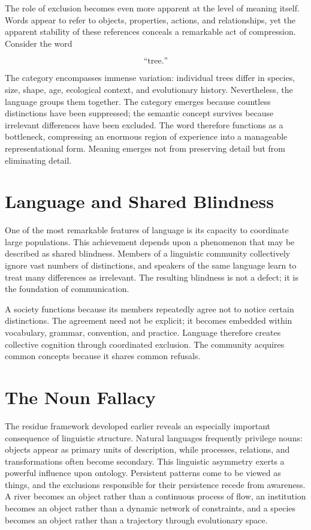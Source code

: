 \documentclass[11pt,oneside]{book}
\theoremstyle{plain}
\theoremstyle{definition}
\theoremstyle{remark}
\begin{document}
The role of exclusion becomes even more apparent at the level of meaning itself. Words appear to refer to objects, properties, actions, and relationships, yet the apparent stability of these references conceals a remarkable act of compression. Consider the word

\begin{equation}
\text{``tree.''}
\end{equation}

The category encompasses immense variation: individual trees differ in species, size, shape, age, ecological context, and evolutionary history. Nevertheless, the language groups them together. The category emerges because countless distinctions have been suppressed; the semantic concept survives because irrelevant differences have been excluded. The word therefore functions as a bottleneck, compressing an enormous region of experience into a manageable representational form. Meaning emerges not from preserving detail but from eliminating detail.

\section{Language and Shared Blindness}

One of the most remarkable features of language is its capacity to coordinate large populations. This achievement depends upon a phenomenon that may be described as shared blindness. Members of a linguistic community collectively ignore vast numbers of distinctions, and speakers of the same language learn to treat many differences as irrelevant. The resulting blindness is not a defect; it is the foundation of communication.

A society functions because its members repeatedly agree not to notice certain distinctions. The agreement need not be explicit; it becomes embedded within vocabulary, grammar, convention, and practice. Language therefore creates collective cognition through coordinated exclusion. The community acquires common concepts because it shares common refusals.

\section{The Noun Fallacy}

The residue framework developed earlier reveals an especially important consequence of linguistic structure. Natural languages frequently privilege nouns: objects appear as primary units of description, while processes, relations, and transformations often become secondary. This linguistic asymmetry exerts a powerful influence upon ontology. Persistent patterns come to be viewed as things, and the exclusions responsible for their persistence recede from awareness. A river becomes an object rather than a continuous process of flow, an institution becomes an object rather than a dynamic network of constraints, and a species becomes an object rather than a trajectory through evolutionary space.
\end{document}
